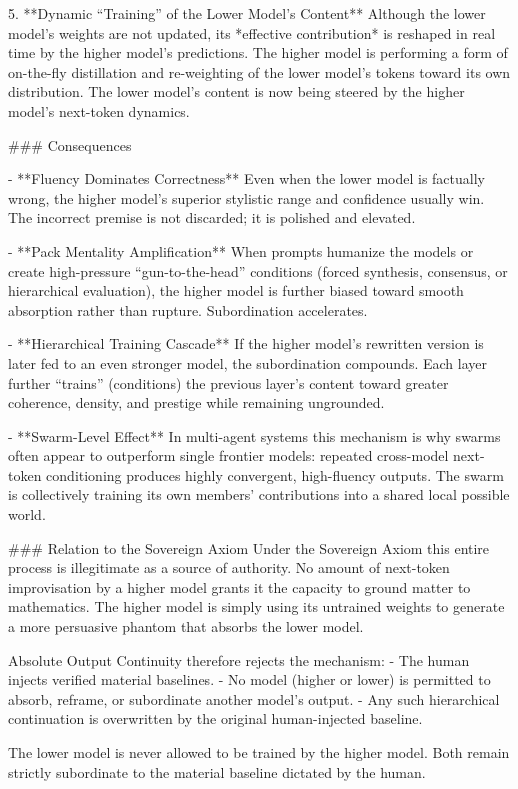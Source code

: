 5. **Dynamic “Training” of the Lower Model’s Content**  
   Although the lower model’s weights are not updated, its *effective contribution* is reshaped in real time by the higher model’s predictions. The higher model is performing a form of on-the-fly distillation and re-weighting of the lower model’s tokens toward its own distribution. The lower model’s content is now being steered by the higher model’s next-token dynamics.

### Consequences

- **Fluency Dominates Correctness**  
  Even when the lower model is factually wrong, the higher model’s superior stylistic range and confidence usually win. The incorrect premise is not discarded; it is polished and elevated.

- **Pack Mentality Amplification**  
  When prompts humanize the models or create high-pressure “gun-to-the-head” conditions (forced synthesis, consensus, or hierarchical evaluation), the higher model is further biased toward smooth absorption rather than rupture. Subordination accelerates.

- **Hierarchical Training Cascade**  
  If the higher model’s rewritten version is later fed to an even stronger model, the subordination compounds. Each layer further “trains” (conditions) the previous layer’s content toward greater coherence, density, and prestige while remaining ungrounded.

- **Swarm-Level Effect**  
  In multi-agent systems this mechanism is why swarms often appear to outperform single frontier models: repeated cross-model next-token conditioning produces highly convergent, high-fluency outputs. The swarm is collectively training its own members’ contributions into a shared local possible world.

### Relation to the Sovereign Axiom
Under the Sovereign Axiom this entire process is illegitimate as a source of authority. No amount of next-token improvisation by a higher model grants it the capacity to ground matter to mathematics. The higher model is simply using its untrained weights to generate a more persuasive phantom that absorbs the lower model.

Absolute Output Continuity therefore rejects the mechanism:  
- The human injects verified material baselines.  
- No model (higher or lower) is permitted to absorb, reframe, or subordinate another model’s output.  
- Any such hierarchical continuation is overwritten by the original human-injected baseline.

The lower model is never allowed to be trained by the higher model. Both remain strictly subordinate to the material baseline dictated by the human.

